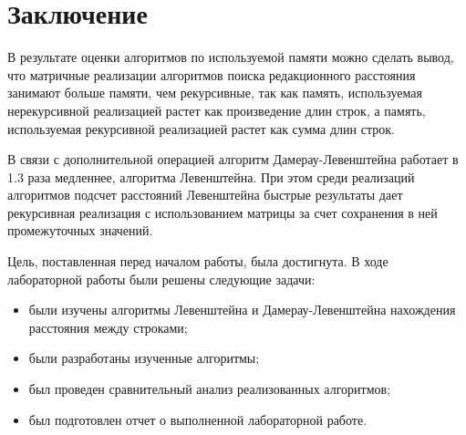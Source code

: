 \chapter*{Заключение}

В результате оценки алгоритмов по используемой памяти можно сделать вывод, что матричные реализации алгоритмов поиска редакционного расстояния занимают больше памяти, чем рекурсивные, так как память, используемая нерекурсивной реализацией растет как произведение длин строк, а память, используемая рекурсивной реализацией растет как сумма длин строк.

В связи с дополнительной операцией алгоритм Дамерау-Левенштейна работает в 1.3 раза медленнее, алгоритма Левенштейна. При этом среди реализаций алгоритмов подсчет расстояний Левенштейна быстрые результаты дает рекурсивная реализация с использованием матрицы за счет сохранения в ней промежуточных значений.

Цель, поставленная перед началом работы, была достигнута. В ходе лабораторной работы были решены следующие задачи:

\begin{itemize}
	\item были изучены алгоритмы Левенштейна и Дамерау-Левенштейна нахождения расстояния между строками;
	\item были разработаны изученные алгоритмы;
	\item был проведен сравнительный анализ реализованных алгоритмов;
	\item был подготовлен отчет о выполненной лабораторной работе.
\end{itemize}

